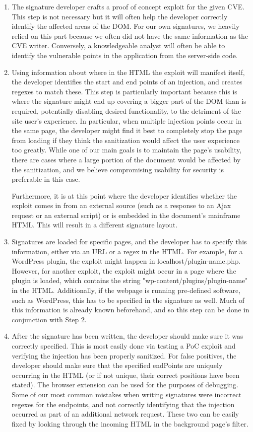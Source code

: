 \begin{enumerate}
	\item{
The signature developer crafts a proof of concept exploit for the given CVE. This step is not necessary but it will often help the developer correctly identify the affected areas of the DOM. For our own signatures, we heavily relied on this part because we often did not have the same information as the CVE writer.
Conversely, a knowledgeable analyst will often be able to identify the vulnerable points in the application from the server-side code.}
\item
Using information about where in the HTML the exploit will manifest itself, the developer identifies the start and end points of an injection, and creates regexes to match these. This step is particularly important because this is where the signature might end up covering a bigger part of the DOM than is required, potentially disabling desired functionality, to the detriment of the site user's experience. In particular, when multiple injection points occur in the same page, the developer might find it best to completely stop the page from loading if they think the sanitization would affect the user experience too greatly. While one of our main goals is to maintain the page's usability, there are cases where a large portion of the document would be affected by the sanitization, and we believe compromising usability for security is preferable in this case.

Furthermore, it is at this point where the developer identifies whether the exploit comes in from an external source (such as a response to an Ajax request or an external script) or is embedded in the document's mainframe HTML. This will result in a different signature layout. 
\item
Signatures are loaded for specific pages, and the developer has to specify this information, either via an URL or a regex in the HTML. For example, for a WordPress plugin, the exploit might happen in localhost/plugin-name.php. However, for another exploit, the exploit might occur in a page where the plugin is loaded, which contains the string "wp-content/plugins/plugin-name" in the HTML. Additionally, if the webpage is running pre-defined software, such as WordPress, this has to be specified in the signature as well. Much of this information is already known beforehand, and so this step can be done in conjunction with Step 2.
\item
After the signature has been written, the developer should make sure it was correctly specified. This is most easily done via testing a PoC exploit and verifying the injection has been properly sanitized. For false positives, the developer should make sure that the specified endPoints are uniquely occurring in the HTML (or if not unique, their correct positions have been stated). The browser extension can be used for the purposes of debugging. Some of our most common mistakes when writing signatures were incorrect regexes for the endpoints, and not correctly identifying that the injection occurred as part of an additional network request. These two can be easily fixed by looking through the incoming HTML in the background page's filter. 
\end{enumerate}

